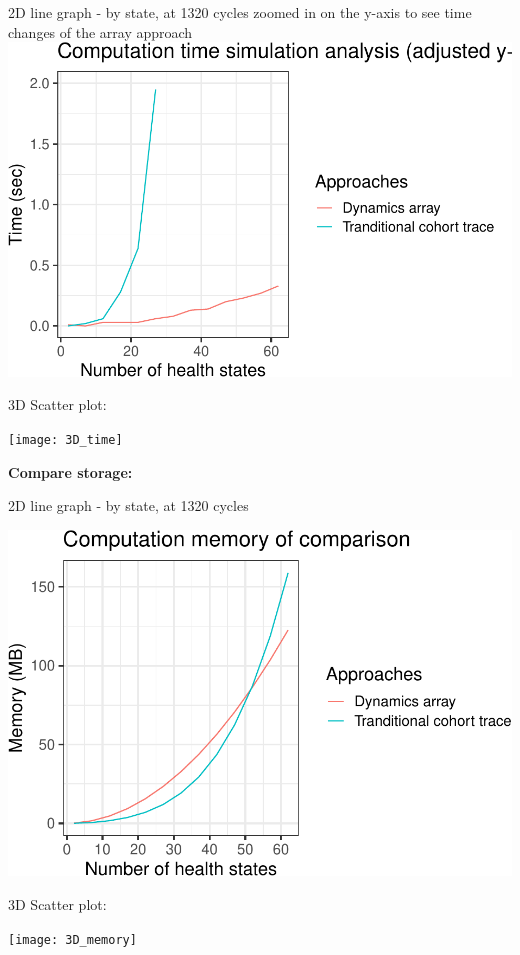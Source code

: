 \documentclass[]{article}
\begin{document}
2D line graph - by state, at 1320 cycles zoomed in on the y-axis to see
time changes of the array approach
\includegraphics{compare_time_memory_files/figure-latex/unnamed-chunk-2-1.pdf}

3D Scatter plot:

\texttt{[image: 3D\_time]}

\textbf{Compare storage:}

2D line graph - by state, at 1320 cycles

\includegraphics{compare_time_memory_files/figure-latex/unnamed-chunk-5-1.pdf}

3D Scatter plot:

\texttt{[image: 3D\_memory]}
\end{document}

